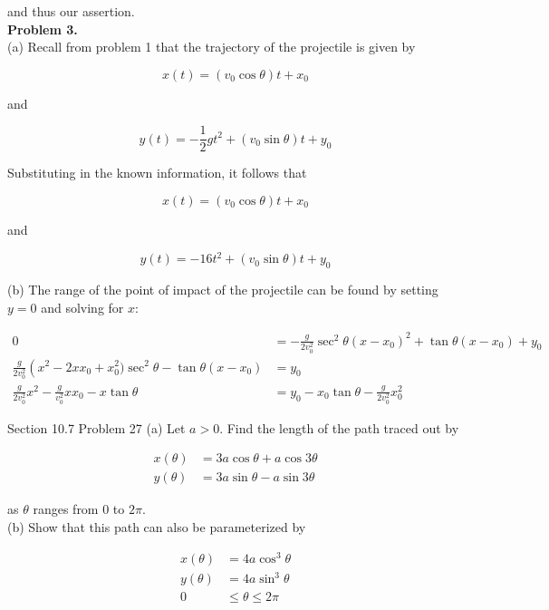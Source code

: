\documentclass{article}
\begin{document}
    and thus our assertion. \\

    \textbf{Problem 3.} \\
    (a) Recall from problem 1 that the trajectory of the projectile is given by

    \[
        x(t) = (v_0 \cos{\theta})t + x_0
    \]

    and

    \[
        y(t) = -\frac{1}{2}gt^2 + (v_0 \sin{\theta})t + y_0
    \]

    Substituting in the known information, it follows that

    \[
        x(t) = (v_0 \cos{\theta})t + x_0
    \]

    and

    \[
        y(t) = -16t^2 + (v_0 \sin{\theta})t + y_0
    \]

    (b) The range of the point of impact of the projectile can be found by setting $y=0$ and solving for $x$:

    \begin{align*}
        0   &= -\frac{g}{2v_0^2} \sec^2{\theta}(x-x_0)^2 + \tan{\theta}(x-x_0) + y_0 \\
        \frac{g}{2v_0^2}\left(x^2-2xx_0 + x_0^2)\sec^2{\theta} - \tan{\theta}(x-x_0)    &= y_0 \\
        \frac{g}{2v_0^2}x^2 - \frac{g}{v_0^2}xx_0 - x\tan{\theta}                       &= y_0 - x_0\tan{\theta} - \frac{g}{2v_0^2}x^2_0
    \end{align*}


    \begin{tbhtheorem}{Section 10.7 Problem 27}
        (a) Let $a > 0$. Find the length of the path traced out by

        \begin{align*}
            x(\theta)   &= 3a\cos{\theta} + a\cos{3\theta} \\
            y(\theta)   &= 3a\sin{\theta} - a\sin{3\theta}
        \end{align*}

        as $\theta$ ranges from 0 to $2\pi$. \\
        (b) Show that this path can also be parameterized by

        \begin{align*}
            x(\theta)   &= 4a\cos^3{\theta} \\
            y(\theta)   &= 4a\sin^3{\theta} \\
            0           &\leq \theta \leq 2 \pi
        \end{align*}
    \end{tbhtheorem}
\end{document}
